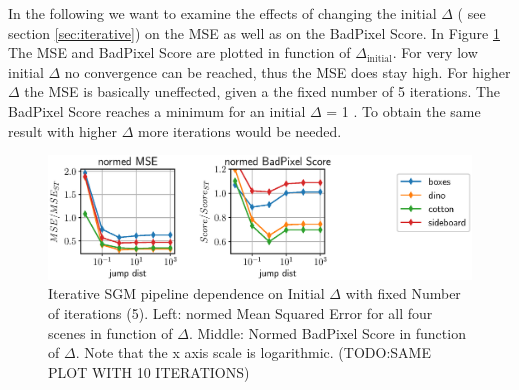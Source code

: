 \documentclass  [
  paper    = a4,
  BCOR     = 10mm,
  twoside,
  fontsize = 12pt,
  fleqn,
  toc      = bibnumbered,
  toc      = listofnumbered,
  numbers  = noendperiod,
  headings = normal,
  listof   = leveldown,
  version  = 3.03
]                                       {scrreprt}
\begin{document}
In the following we want to examine the effects of changing the initial $\Delta$ ( see section \ref{sec:iterative}) on the MSE as well as on the BadPixel Score. In Figure \ref{fig:chooselowersgmpprmergeiterationsexppenalty1} The MSE and BadPixel Score are plotted in function of $\Delta_\text{initial}$. For very low initial $\Delta$ no convergence can be reached, thus the MSE does stay high. For higher $\Delta$ the MSE is basically uneffected, given a the fixed number of 5 iterations. The BadPixel Score reaches a minimum for an initial $\Delta$ = 1 . To obtain the same result with higher $\Delta$ more iterations would be needed.
\begin{figure}
	\centering
	\includegraphics[width=1\linewidth]{images/choose_lower_sgm_ppr_merge_iterations_exp_penalty1}
	\caption[Iterative SGM dependence on Jump Distance ]{Iterative SGM pipeline dependence on Initial $\Delta$ with fixed Number of iterations (5). Left: normed Mean Squared Error for all four scenes in function of $\Delta$. Middle: Normed BadPixel Score in function of $\Delta$. Note that the x axis scale is logarithmic. (TODO:SAME PLOT WITH 10 ITERATIONS)}
	\label{fig:chooselowersgmpprmergeiterationsexppenalty1}
\end{figure}
\end{document}
